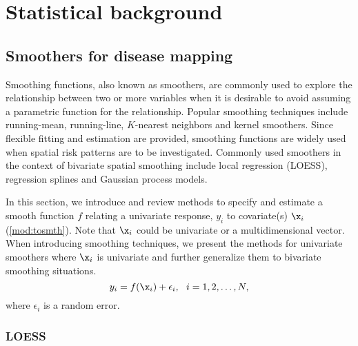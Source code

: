 \chapter{Statistical background}

\section{Smoothers for disease mapping}
	Smoothing functions, also known as smoothers, are commonly used to explore the relationship between two or more variables when it is desirable to avoid assuming a parametric function for the relationship. Popular smoothing techniques include running-mean, running-line, $K$-nearest neighbors and kernel smoothers. Since flexible fitting and estimation are provided, smoothing functions are widely used when spatial risk patterns are to be investigated. Commonly used smoothers in the context of bivariate spatial smoothing include local regression (LOESS), regression splines and Gaussian process models. %
	
	In this section, we introduce and review methods to specify and estimate a smooth function $f$ relating a univariate response, $y_i$ to covariate(s) $\x_i$ (\ref{mod:tosmth}). Note that $\x_i$ could be  univariate or a multidimensional vector. When introducing smoothing techniques, we present the methods for univariate smoothers where $\x_i$ is univariate and further generalize them to bivariate smoothing situations. 
	\begin{equation} \label{mod:tosmth}
	y_i =f(\x_i)+\epsilon_i, \ \ i=1,2,\dots,N,
	\end{equation} 
	where $\epsilon_i$ is a random error.


\subsection{LOESS}
	
